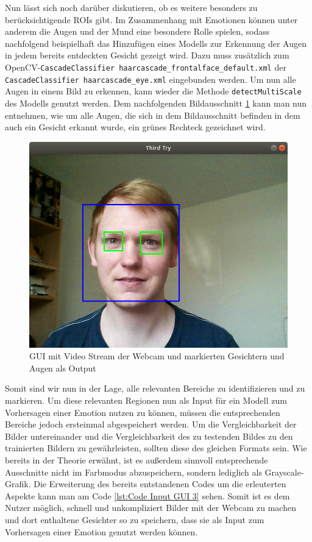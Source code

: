 \documentclass[12pt, a4paper]{report}
\begin{document}
Nun lässt sich noch darüber diskutieren, ob es weitere besonders zu berücksichtigende ROIs gibt. Im Zusammenhang mit Emotionen können unter anderem die Augen und der Mund eine besondere Rolle spielen, sodass nachfolgend beispielhaft das Hinzufügen eines Modells zur Erkennung der Augen in jedem bereits entdeckten Gesicht gezeigt wird. Dazu muss zusätzlich zum OpenCV-\texttt{CascadeClassifier haarcascade\_frontalface\_default.xml} der \texttt{CascadeClassifier haarcascade\_eye.xml} eingebunden werden. Um nun alle Augen in einem Bild zu erkennen, kann wieder die Methode \texttt{detectMultiScale} des Modells genutzt werden. Dem nachfolgenden Bildausschnitt \ref{fig:Input GUI 3} kann man nun entnehmen, wie um alle Augen, die sich in dem Bildausschnitt befinden in dem auch ein Gesicht erkannt wurde, ein grünes Rechteck gezeichnet wird.
\begin{figure}[h]
  \includegraphics[width=\linewidth]{Bilder/InputGUI3.png}
  \caption{GUI mit Video Stream der Webcam und markierten Gesichtern und Augen als Output}
  \label{fig:Input GUI 3}
\end{figure}
Somit sind wir nun in der Lage, alle relevanten Bereiche zu identifizieren und zu markieren. Um diese relevanten Regionen nun als Input für ein Modell zum Vorhersagen einer Emotion nutzen zu können, müssen die entsprechenden Bereiche jedoch ersteinmal abgespeichert werden. Um die Vergleichbarkeit der Bilder untereinander und die Vergleichbarkeit des zu testenden Bildes zu den trainierten Bildern zu gewährleisten, sollten diese des gleichen Formats sein. Wie bereits in der Theorie erwähnt, ist es außerdem sinnvoll entsprechende Ausschnitte nicht im Farbmodus abzuspeichern, sondern lediglich als Grayscale-Grafik. Die Erweiterung des bereits entstandenen Codes um die erleuterten Aspekte kann man am Code \ref{lst:Code Input GUI 3} sehen. Somit ist es dem Nutzer möglich, schnell und unkompliziert Bilder mit der Webcam zu machen und dort enthaltene Gesichter so zu speichern, dass sie als Input zum Vorhersagen einer Emotion genutzt werden können.
\end{document}
